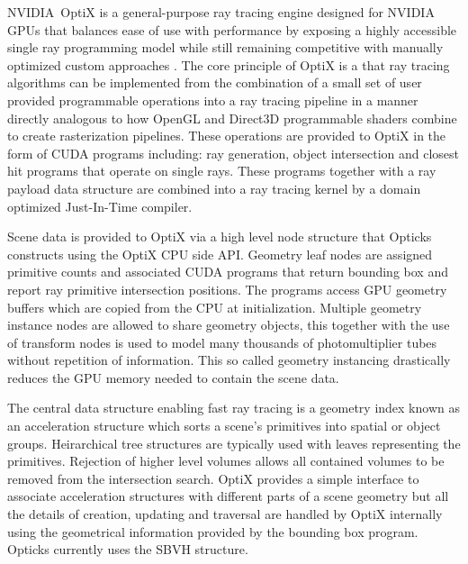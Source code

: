 \documentclass[a4paper]{jpconf}
\begin{document}
NVIDIA\textregistered\ OptiX\texttrademark \cite{optixPaper} \cite{optixSite} 
is a general-purpose ray tracing engine designed for NVIDIA GPUs
that balances ease of use with performance by exposing a highly accessible 
single ray programming model while still remaining competitive with manually 
optimized custom approaches \cite{optixPaper} \cite{understanding}.  
The core principle of OptiX is a that ray tracing algorithms can be implemented 
from the combination of a small set of user provided programmable operations
into a ray tracing pipeline in a manner directly analogous to how OpenGL 
and Direct3D programmable shaders combine to create rasterization pipelines.
These operations are provided to OptiX in the form of CUDA programs \cite{cudaPaper} \cite{cudaURL} 
including: ray generation, object intersection and closest hit programs that operate on 
single rays. These programs together with a ray payload data structure are combined 
into a ray tracing kernel by a domain optimized Just-In-Time compiler.


Scene data is provided to OptiX via a high level node structure that 
Opticks constructs using the OptiX CPU side API. 
Geometry leaf nodes are assigned primitive counts 
and associated CUDA programs that return bounding box and 
report ray primitive intersection positions. 
The programs access GPU geometry buffers which are copied from the CPU at initialization.
Multiple geometry instance nodes are allowed to share geometry objects, this 
together with the use of transform nodes is used to model many thousands of  
photomultiplier tubes without repetition of information. This so called geometry 
instancing drastically reduces the GPU memory needed to contain the scene data.

The central data structure enabling fast ray tracing is a geometry index
known as an acceleration structure which sorts a scene’s primitives 
into spatial or object groups. 
Heirarchical tree structures are typically used
with leaves representing the primitives.  Rejection of higher level
volumes allows all contained volumes to be removed from the intersection
search. OptiX provides a simple interface to associate acceleration structures 
with different parts of a scene geometry but all the details of creation, updating 
and traversal are handled by OptiX internally using the geometrical information provided by the 
bounding box program. Opticks currently uses the SBVH structure\cite{SBVH}.



\end{document}
